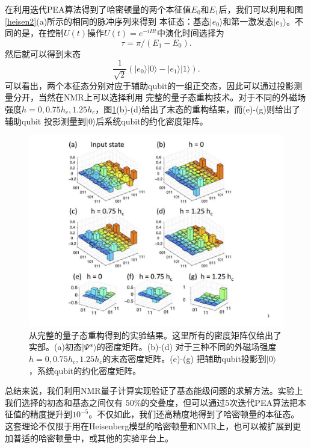  在利用迭代PEA算法得到了哈密顿量的两个本征值$E_0$和$E_1$后，我们可以利用和图\ref{heisen2}(a)所示的相同的脉冲序列来得到
 本征态：基态$|e_0\rangle$和第一激发态$|e_1\rangle$。不同的是，在控制$U(t)$操作$U(t) =  e^{-iHt}$中演化时间选择为
 \begin{equation}
\tau = \pi/(E_1-E_0).
\end{equation}
然后就可以得到末态
 \begin{equation}
\frac{1}{\sqrt{2}}(|e_0\rangle|0\rangle-|e_1\rangle|1\rangle).
\end{equation}
可以看出，两个本征态分别对应于辅助qubit的一组正交态，因此可以通过投影测量分开，当然在NMR上可以选择利用
完整的量子态重构技术。对于不同的外磁场强度$h = 0,0.75h_c,1.25h_c$，图\ref{heisen5}(b)-(d)给出了末态的重构结果，而(e)-(g)则给出了辅助qubit
投影测量到$|0\rangle$后系统qubit的约化密度矩阵。

 \begin{figure}[htbp]
            \begin{center}
              \includegraphics[width= 0.8\columnwidth]{figures/heisen5.pdf}
              \caption{从完整的量子态重构得到的实验结果。这里所有的密度矩阵仅给出了实部。(a)初态$|\Psi\ast\rangle$的密度矩阵。(b)-(d)
              对于三种不同的外磁场强度$h = 0,0.75h_c,1.25h_c$的末态密度矩阵。(e)-(g) 把辅助qubit投影到$|0\rangle$，系统qubit的约化密度矩阵。}\label{heisen5}
            \end{center}
 \end{figure}
 
 总结来说，我们利用NMR量子计算实现验证了基态能级问题的求解方法。实验上我们选择的初态和基态之间仅有
 $50\%$的交叠度，但可以通过5次迭代PEA算法把本征值的精度提升到$10^{-5}$。不仅如此，我们还高精度地得到了哈密顿量的本征态。
 这套理论不仅限于用在Heisenberg模型的哈密顿量和NMR上，也可以被扩展到更加普适的哈密顿量中，或其他的实验平台上。
 
